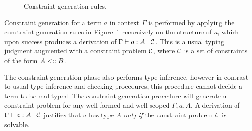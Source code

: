 \documentclass[runningheads]{llncs}
\begin{document}
\begin{figure}[tb]
\begin{mathpar}


  \end{mathpar}

  \caption{Constraint generation rules.}
  \label{fig:constraint-generation-rules}
\end{figure}

Constraint generation for a term $a$ in context $\Gamma$ is performed by applying the constraint generation rules in Figure~\ref{fig:constraint-generation-rules} recursively on the structure of $a$, which upon success produces a derivation of $\Gamma \vdash a : A \mid \mathcal{C}$.
This is a usual typing judgment augmented with a constraint problem $\mathcal{C}$, where $\mathcal{C}$ is a set of constraints of the form $A \mathrel{<::} B$.

The constraint generation phase also performs type inference, however in contrast to usual type inference and checking procedures, this procedure cannot decide a term to be mal-typed.
The constraint generation procedure will generate a constraint problem for any well-formed and well-scoped $\Gamma, a, A$.
A derivation of $\Gamma \vdash a : A \mid \mathcal{C}$ justifies that $a$ has type $A$ \textit{only if} the constraint problem $\mathcal{C}$ is solvable.
\end{document}
